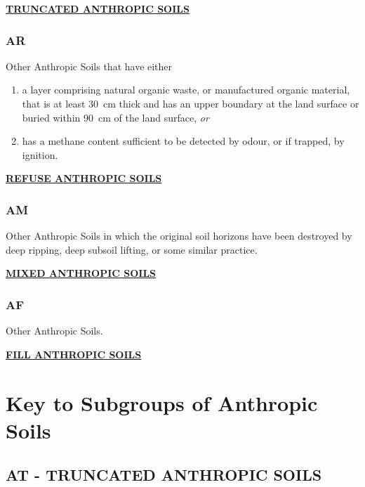 \documentclass[
  letterpaper,
  DIV=11,
  numbers=noendperiod]{scrreprt}
\providecommand{\tightlist}{%
  \setlength{\itemsep}{0pt}\setlength{\parskip}{0pt}}\usepackage{longtable,booktabs,array}
\begin{document}
\protect\hyperlink{sec-AT}{\textbf{TRUNCATED ANTHROPIC SOILS}}

\hypertarget{sec-key-AR}{%
\subsubsection{\texorpdfstring{\textbf{AR}}{AR}}\label{sec-key-AR}}

Other Anthropic Soils that have either

\begin{enumerate}
\def\labelenumi{\arabic{enumi}.}
\tightlist
\item
  a layer comprising natural organic waste, or manufactured organic
  material, that is at least 30~cm thick and has an upper boundary at
  the land surface or buried within 90~cm of the land surface, \emph{or}
\item
  has a methane content sufficient to be detected by odour, or if
  trapped, by ignition.
\end{enumerate}

\protect\hyperlink{sec-AR}{\textbf{REFUSE ANTHROPIC SOILS}}

\hypertarget{sec-key-AM}{%
\subsubsection{\texorpdfstring{\textbf{AM}}{AM}}\label{sec-key-AM}}

Other Anthropic Soils in which the original soil horizons have been
destroyed by deep ripping, deep subsoil lifting, or some similar
practice.

\protect\hyperlink{sec-AM}{\textbf{MIXED ANTHROPIC SOILS}}

\hypertarget{sec-key-AF}{%
\subsubsection{\texorpdfstring{\textbf{AF}}{AF}}\label{sec-key-AF}}

Other Anthropic Soils.

\protect\hyperlink{sec-AF}{\textbf{FILL ANTHROPIC SOILS}}

\hypertarget{sec-sub-A}{%
\section{Key to Subgroups of Anthropic Soils}\label{sec-sub-A}}

\hypertarget{sec-AT}{%
\subsection{\texorpdfstring{\textbf{AT} - TRUNCATED ANTHROPIC
SOILS}{AT - TRUNCATED ANTHROPIC SOILS}}\label{sec-AT}}
\end{document}
